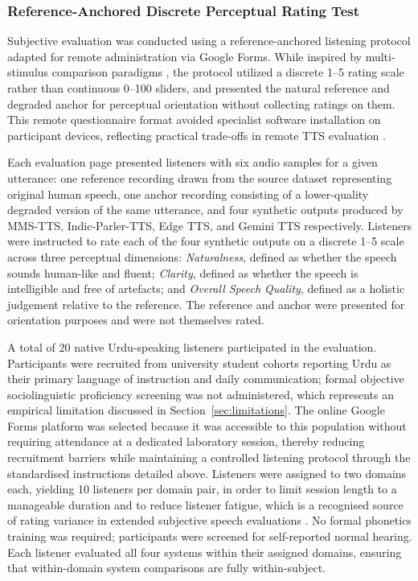 \documentclass[a4paper,fleqn]{cas-dc}
\begin{document}
    \subsubsection{Reference-Anchored Discrete Perceptual Rating Test}\label{sec:methodology-mushra}
    \begin{sloppypar}
    Subjective evaluation was conducted using a reference-anchored listening protocol
    adapted for remote administration via Google Forms.
    While inspired by multi-stimulus comparison paradigms \citep{itu2015mushra}, the protocol
    utilized a discrete 1--5 rating scale rather than continuous 0--100 sliders, and presented
    the natural reference and degraded anchor for perceptual orientation without collecting ratings on them.
    This remote questionnaire format avoided specialist software installation on participant devices,
    reflecting practical trade-offs in remote TTS evaluation \citep{varadhan2024mushra}.
    
    Each evaluation page presented listeners with six audio samples for a
    given utterance: one reference recording drawn from the source dataset
    representing original human speech, one anchor recording consisting of
    a lower-quality degraded version of the same utterance, and four synthetic
    outputs produced by MMS-TTS, Indic-Parler-TTS, Edge TTS, and Gemini TTS
    respectively. Listeners were instructed to rate each of the four synthetic
    outputs on a discrete 1--5 scale across three perceptual dimensions:
    \emph{Naturalness}, defined as whether the speech sounds human-like and
    fluent; \emph{Clarity}, defined as whether the speech is intelligible and
    free of artefacts; and \emph{Overall Speech Quality}, defined as a holistic
    judgement relative to the reference. The reference and anchor were presented
    for orientation purposes and were not themselves rated.
    
    
    A total of 20 native Urdu-speaking listeners participated in the
    evaluation. Participants were recruited from university student cohorts
    reporting Urdu as their primary language of instruction and daily communication;
    formal objective sociolinguistic proficiency screening was not administered,
    which represents an empirical limitation discussed in Section~\ref{sec:limitations}.
    The online Google Forms platform was selected because it was
    accessible to this population without requiring attendance at a
    dedicated laboratory session, thereby reducing recruitment barriers
    while maintaining a controlled listening protocol through the
    standardised instructions detailed above. Listeners were assigned
    to two domains each, yielding 10 listeners per domain pair, in order
    to limit session length to a manageable duration and to reduce
    listener fatigue, which is a recognised source of rating variance
    in extended subjective speech evaluations \citep{lemaguer2024limits}.
    No formal phonetics training was required; participants were screened
    for self-reported normal hearing. Each listener evaluated all four
    systems within their assigned domains, ensuring that within-domain
    system comparisons are fully within-subject.
    

\end{sloppypar}
\end{document}
